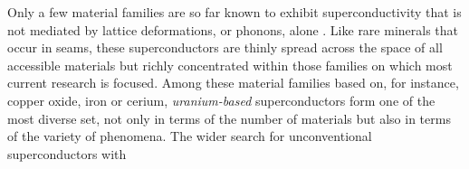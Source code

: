 Only a few material families are so far known to exhibit superconductivity
that is not mediated by lattice deformations, or phonons, alone \cite{monthoux07,norman11}. Like rare minerals that occur in seams, these superconductors are thinly spread across the space of all accessible materials but richly concentrated within those families on which most current research is focused. Among these material families based on, for instance, copper oxide, iron or cerium, \emph{uranium-based} superconductors form one of the most diverse set, not only in terms of the number of materials but also in terms of the variety of phenomena. The wider search for unconventional superconductors with 

